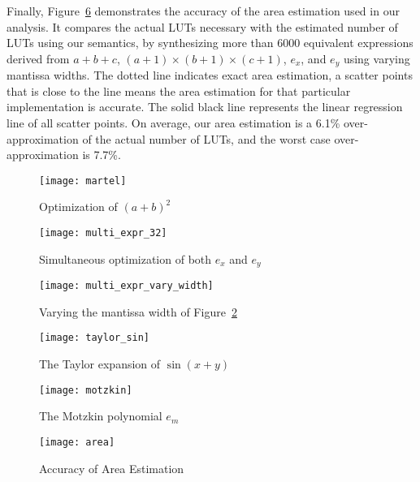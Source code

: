 Finally, Figure~\ref{fig:area} demonstrates the accuracy of the area estimation
used in our analysis. It compares the actual LUTs necessary with the estimated
number of LUTs using our semantics, by synthesizing more than 6000 equivalent
expressions derived from $a + b + c$, $(a + 1) \times (b + 1) \times (c + 1)$,
$e_x$, and $e_y$ using varying mantissa widths. The dotted line indicates exact
area estimation, a scatter points that is close to the line means the area
estimation for that particular implementation is accurate. The solid black line
represents the linear regression line of all scatter points. On average, our
area estimation is a 6.1\% over-approximation of the actual number of LUTs, and
the worst case over-approximation is 7.7\%.
\newcommand{\figsize}{0.6}
\begin{figure}[ht]
    \centering
    \texttt{[image: martel]}
    \caption{Optimization of ${(a + b)}^2$}\label{fig:martel}
\end{figure}
\begin{figure}[ht]
    \centering
    \texttt{[image: multi\_expr\_32]}
    \caption{Simultaneous optimization of both $e_x$ and $e_y$}
    {}\label{fig:multi_expr_32}
\end{figure}
\begin{figure}[ht]
    \centering
    \texttt{[image: multi\_expr\_vary\_width]}
    \caption{Varying the mantissa width of Figure~\ref{fig:multi_expr_32}}
    {}\label{fig:multi_expr_vary_width}
\end{figure}
\begin{figure}[ht]
    \centering
    \texttt{[image: taylor\_sin]}
    \caption{The Taylor expansion of $\sin(x + y)$}
    {}\label{fig:taylor_sin}
\end{figure}
\begin{figure}[ht]
    \centering
    \texttt{[image: motzkin]}
    \caption{The Motzkin polynomial $e_m$}\label{fig:motzkin}
\end{figure}
\begin{figure}[ht]
    \centering
    \texttt{[image: area]}
    \caption{Accuracy of Area Estimation}\label{fig:area}
\end{figure}
